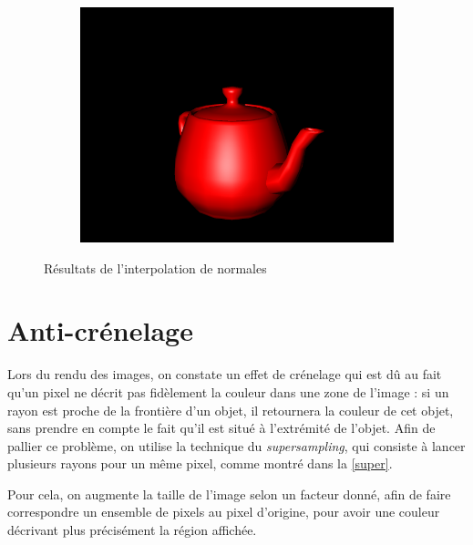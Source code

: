 \documentclass{article}
\begin{document}
\begin{figure}[hb]
  \begin{subfigure}{0.45\textwidth}
    \includegraphics[width=1\textwidth]{images/nres1.png}
  \end{subfigure}

  \caption{Résultats de l'interpolation de normales\label{normal}}
\end{figure}

\section{Anti-crénelage}

Lors du rendu des images, on constate un effet de crénelage qui est dû au
fait qu'un pixel ne décrit pas fidèlement la couleur dans une zone de l'image :
si un rayon est proche de la frontière d'un objet, il retournera la couleur de
cet objet, sans prendre en compte le fait qu'il est situé à l'extrémité de
l'objet. Afin de pallier ce problème, on utilise la technique du
\emph{supersampling}, qui consiste à lancer plusieurs rayons pour un même pixel,
comme montré dans la \cref{super}.

Pour cela, on augmente la taille de l'image selon un facteur donné, afin de
faire correspondre un ensemble de pixels au pixel d'origine, pour avoir une
couleur décrivant plus précisément la région affichée.
\end{document}

